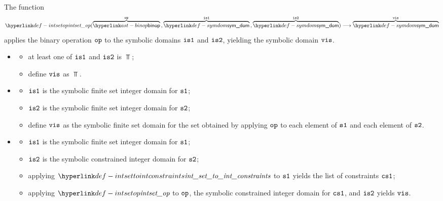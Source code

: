 \begin{mathpar}
\end{mathpar}

\hypertarget{def-intsetop}{}
The function
\[
\intsetop(\overname{\binop}{\op} \aslsep \overname{\symdom}{\visone} \aslsep \overname{\symdom}{\vistwo})
\aslto \overname{\symdom}{\vis}
\]
applies the binary operation $\op$ to the symbolic domains $\visone$ and $\vistwo$,
yielding the symbolic domain $\vis$.

\ProseParagraph
\OneApplies
\begin{itemize}
  \item {}
  \begin{itemize}
    \item at least one of $\visone$ and $\vistwo$ is $\Top$;
    \item define $\vis$ as $\Top$.
  \end{itemize}

  \item {}
  \begin{itemize}
    \item $\visone$ is the symbolic finite set integer domain for $\vsone$;
    \item $\vistwo$ is the symbolic finite set integer domain for $\vstwo$;
    \item define $\vis$ as the symbolic finite set domain for the set obtained
          by applying $\op$ to each element of $\vsone$ and each element of $\vstwo$.
  \end{itemize}

  \item {}
  \begin{itemize}
    \item $\visone$ is the symbolic finite set integer domain for $\vsone$;
    \item $\vistwo$ is the symbolic constrained integer domain for $\vstwo$;
    \item applying $\intsettointconstraints$ to $\vsone$ yields the list of constraints $\csone$;
    \item applying $\intsetop$ to $\op$, the symbolic constrained integer domain for $\csone$,
          and $\vistwo$ yields $\vis$.
  \end{itemize}


\end{itemize}
